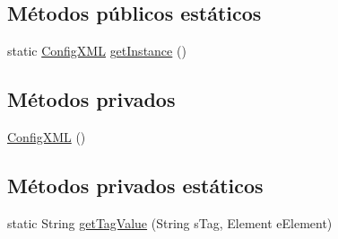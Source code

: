\subsection*{Métodos públicos estáticos}
\begin{DoxyCompactItemize}
\item 
static \mbox{\hyperlink{classconfiguration_1_1_config_x_m_l}{Config\+X\+ML}} \mbox{\hyperlink{classconfiguration_1_1_config_x_m_l_a74c5e0c09c0139554ede8d786cb808ff}{get\+Instance}} ()
\end{DoxyCompactItemize}
\subsection*{Métodos privados}
\begin{DoxyCompactItemize}
\item 
\mbox{\hyperlink{classconfiguration_1_1_config_x_m_l_a0a848755f002c9c252612e188da0fee0}{Config\+X\+ML}} ()
\end{DoxyCompactItemize}
\subsection*{Métodos privados estáticos}
\begin{DoxyCompactItemize}
\item 
static String \mbox{\hyperlink{classconfiguration_1_1_config_x_m_l_ae3039f7e5dfe2bfcbb1ab63104b451b2}{get\+Tag\+Value}} (String s\+Tag, Element e\+Element)
\end{DoxyCompactItemize}
